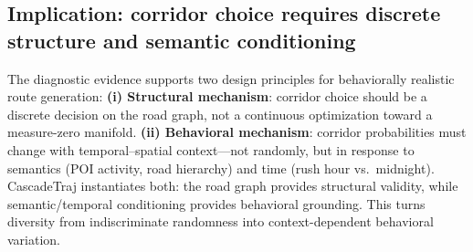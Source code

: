 \subsection{Implication: corridor choice requires discrete structure and semantic conditioning}
\label{sec:results-roadaware}

The diagnostic evidence supports two design principles for behaviorally realistic route generation:
\textbf{(i) Structural mechanism}: corridor choice should be a discrete decision on the road graph, not a continuous optimization toward a measure-zero manifold.
\textbf{(ii) Behavioral mechanism}: corridor probabilities must change with temporal--spatial context---not randomly, but in response to semantics (POI activity, road hierarchy) and time (rush hour vs.\ midnight).
CascadeTraj instantiates both: the road graph provides structural validity, while semantic/temporal conditioning provides behavioral grounding. This turns diversity from indiscriminate randomness into context-dependent behavioral variation.
